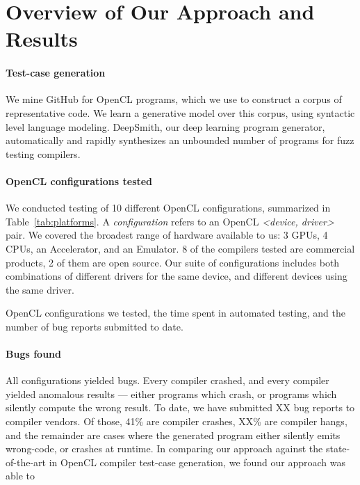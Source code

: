 \section{Overview of Our Approach and Results}\label{sec:overview}

\paragraph{Test-case generation} We mine GitHub for OpenCL programs, which we use to construct a corpus of representative code. We learn a generative model over this corpus, using syntactic level language modeling. DeepSmith, our deep learning program generator, automatically and rapidly synthesizes an unbounded number of programs for fuzz testing compilers.

\paragraph{OpenCL configurations tested} We conducted testing of 10 different OpenCL configurations, summarized in Table~\ref{tab:platforms}. A \emph{configuration} refers to an OpenCL \emph{<device, driver>} pair. We covered the broadest range of hardware available to us: 3 GPUs, 4 CPUs, an Accelerator, and an Emulator. 8 of the compilers tested are commercial products, 2 of them are open source. Our suite of configurations includes both combinations of different drivers for the same device, and different devices using the same driver.


\begin{table*}[t!]
	\scriptsize %
	\centering %
	
	\caption{OpenCL configurations we tested, the time spent in automated testing, and the number of bug reports submitted to date.}
	\label{tab:platforms}
\end{table*}


\paragraph{Bugs found} All configurations yielded bugs. Every compiler crashed, and every compiler yielded anomalous results --- either programs which crash, or programs which silently compute the wrong result. To date, we have submitted XX bug reports to compiler vendors. Of those, 41\% are compiler crashes, XX\% are compiler hangs, and the remainder are cases where the generated program either silently emits wrong-code, or crashes at runtime. In comparing our approach against the state-of-the-art in OpenCL compiler test-case generation, we found our approach was able to \cc{\ldots}